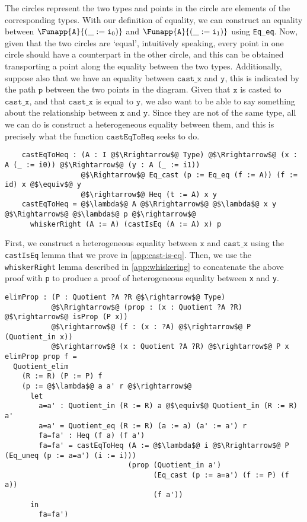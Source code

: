 \documentclass[12pt,twoside,maitrise]{dms}
\theoremstyle{definition}
\numberwithin{equation}{section}
\numberwithin{table}{chapter}
\numberwithin{figure}{chapter}
\newcommand\id[1] {\texttt{#1}}
\begin{document}
\begin{center}
\begin{tikzpicture}[x=0.75pt,y=0.75pt,yscale=-1,xscale=1]
\end{tikzpicture}

\end{center}

The circles represent the two types and points in the circle are elements of the
corresponding types. With our definition of equality, we can construct an
equality between $\Funapp{\id{A}}{(\earg{\_}{\ileft})}$ and
$\Funapp{\id{A}}{(\earg{\_}{\iright})}$ using \id{Eq\_eq}. Now, given that the
two circles are `equal', intuitively speaking, every point in one circle should
have a counterpart in the other circle, and this can be obtained transporting a
point along the equality between the two types. Additionally, suppose also that
we have an equality between $\id{cast\_x}$ and $\id{y}$, this is indicated
by the path $\id{p}$ between the two points in the diagram. Given that $\id{x}$
is casted to $\id{cast\_x}$, and that $\id{cast\_x}$ is equal to
$\id{y}$, we also want to be able to say something about the relationship
between $\id{x}$ and $\id{y}$. Since they are not of the same type, all we can
do is construct a heterogeneous equality between them, and this is precisely
what the function $\id{castEqToHeq}$ seeks to do.

\begin{verbatim}
    castEqToHeq : (A : I @$\Rrightarrow$@ Type) @$\Rrightarrow$@ (x : A (_ := i0)) @$\Rightarrow$@ (y : A (_ := i1))
                  @$\Rightarrow$@ Eq_cast (p := Eq_eq (f := A)) (f := id) x @$\equiv$@ y
                  @$\rightarrow$@ Heq (t := A) x y
    castEqToHeq = @$\lambda$@ A @$\Rrightarrow$@ @$\lambda$@ x y @$\Rightarrow$@ @$\lambda$@ p @$\rightarrow$@
      whiskerRight (A := A) (castIsEq (A := A) x) p
\end{verbatim}

First, we construct a heterogeneous equality between $\id{x}$ and $\id{cast\_x}$
using the \id{castIsEq} lemma that we prove in \autoref{app:cast-is-eq}. Then,
we use the \id{whiskerRight} lemma described in \autoref{app:whiskering} to
concatenate the above proof with \id{p} to produce a proof of heterogeneous
equality between \id{x} and \id{y}.

\begin{verbatim}
elimProp : (P : Quotient ?A ?R @$\rightarrow$@ Type)
           @$\Rrightarrow$@ (prop : (x : Quotient ?A ?R) @$\rightarrow$@ isProp (P x))
           @$\rightarrow$@ (f : (x : ?A) @$\rightarrow$@ P (Quotient_in x))
           @$\rightarrow$@ (x : Quotient ?A ?R) @$\rightarrow$@ P x
elimProp prop f =
  Quotient_elim
    (R := R) (P := P) f
    (p := @$\lambda$@ a a' r @$\rightarrow$@
      let
        a=a' : Quotient_in (R := R) a @$\equiv$@ Quotient_in (R := R) a'
        a=a' = Quotient_eq (R := R) (a := a) (a' := a') r
        fa=fa' : Heq (f a) (f a')
        fa=fa' = castEqToHeq (A := @$\lambda$@ i @$\Rrightarrow$@ P (Eq_uneq (p := a=a') (i := i)))
                             (prop (Quotient_in a')
                                   (Eq_cast (p := a=a') (f := P) (f a))
                                   (f a'))
      in
        fa=fa')
\end{verbatim}
\end{document}
